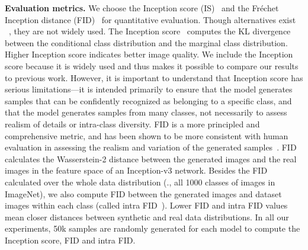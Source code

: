 \documentclass{article}
\begin{document}
 

\textbf{Evaluation metrics. }
{
  We choose the Inception score (IS)~\cite{Salimans2016} and the Fr\'echet Inception distance (FID)~\cite{HeuselRUNH17} for quantitative evaluation.
  Though alternatives exist ~\cite{HYPE,GEOMETRYSCORE,SKILLRATING}, they are not widely used.
  The Inception score~\cite{Salimans2016} computes the KL divergence between the conditional class distribution and the marginal class distribution. Higher Inception score indicates better image quality. We include the Inception score because it is widely used and thus makes it possible to compare our results to previous work. However, it is important to understand that Inception score has serious limitations---it is intended primarily to ensure that the model generates  samples that can be confidently recognized as belonging to a specific class, and that the model generates samples from many classes, not necessarily to assess realism of details or intra-class diversity.
 FID is a more principled and comprehensive metric, and has been shown to be more consistent with human evaluation in assessing the realism and variation of the generated samples~\cite{HeuselRUNH17}. FID calculates the Wasserstein-2 distance between the generated images and the real images in the feature space of an Inception-v3 network. 
 Besides the FID calculated over the whole data distribution (\ie., all 1000 classes of images in ImageNet), we also compute FID between the generated images and dataset images within each class (called intra FID~\cite{Miyato18b}). Lower FID and intra FID values mean closer distances between synthetic and real data distributions. In all our experiments, 50k samples are randomly generated for each model to compute the Inception score, FID and intra FID. 
}
\end{document}
